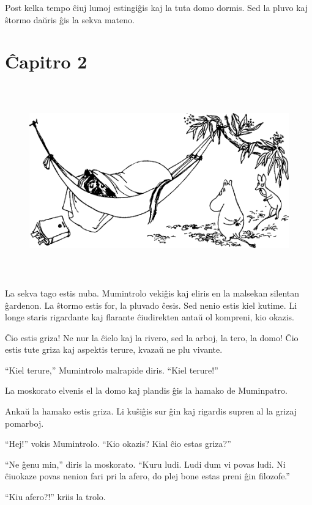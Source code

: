 Post kelka tempo ĉiuj lumoj estingiĝis kaj la tuta domo dormis. Sed la pluvo kaj ŝtormo daŭris ĝis la sekva mateno.

\chapter*[Ĉapitro 2]{Ĉapitro 2}


\begin{figure}[htbp]
\centering
\includegraphics[width=450pt,height=234pt]{2-1.png}
\caption{}
\label{2-1}
\end{figure}

\noindent La sekva tago estis nuba. Mumintrolo vekiĝis kaj eliris en la malsekan silentan ĝardenon. La ŝtormo estis for, la pluvado ĉesis. Sed nenio estis kiel kutime. Li longe staris rigardante kaj flarante ĉiudirekten antaŭ ol kompreni, kio okazis.

Ĉio estis griza! Ne nur la ĉielo kaj la rivero, sed la arboj, la tero, la domo! Ĉio estis tute griza kaj aspektis terure, kvazaŭ ne plu vivante.

``Kiel terure,'' Mumintrolo malrapide diris. ``Kiel terure!''

La moskorato elvenis el la domo kaj plandis ĝis la hamako de Muminpatro.

Ankaŭ la hamako estis griza. Li kuŝiĝis sur ĝin kaj rigardis supren al la grizaj pomarboj.

``Hej!'' vokis Mumintrolo. ``Kio okazis? Kial ĉio estas griza?''

``Ne ĝenu min,'' diris la moskorato. ``Kuru ludi. Ludi dum vi povas ludi. Ni ĉiuokaze povas nenion fari pri la afero, do plej bone estas preni ĝin filozofe.''

``Kiu afero?!'' kriis la trolo.

